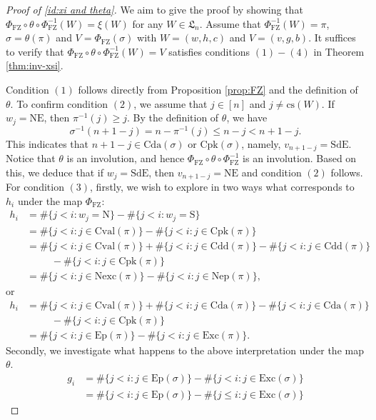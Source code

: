 \documentclass[12pt]{amsart}
\numberwithin{equation}{section}
\theoremstyle{plain}
\theoremstyle{definition}
\def\FZ{\mathrm{FZ}}
\def\LH{\mathfrak{L}}
\def\N{\mathrm{N}}
\def\S{\mathrm{S}}
\def\NE{\mathrm{NE}}
\def\SdE{\mathrm{SdE}}
\def\cs{\mathrm{cs}}
\def\Excp{\mathrm{Ep}}
\def\Exc{\mathrm{Exc}}
\def\Nexc{\mathrm{Nexc}}
\def\Nexcp{\mathrm{Nep}}
\def\Cpk{\mathrm{Cpk}}
\def\Cval{\mathrm{Cval}}
\def\Cda{\mathrm{Cda}}
\def\Cdd{\mathrm{Cdd}}
\begin{document}
\begin{proof}[Proof of \eqref{id:xi and theta}]

We aim to give the proof by showing  that $\Phi_{\FZ} \circ \theta \circ \Phi_{\FZ}^{-1}(W)=\xi(W)$ for any $W\in \LH_n$.
Assume that $\Phi_{\FZ}^{-1}(W)=\pi$, $\sigma=\theta(\pi)$ and $V=\Phi_{\FZ}(\sigma)$ with $W=(w,h,c)$ and $V=(v,g,b)$.
It suffices to verify that $\Phi_{\FZ} \circ \theta \circ \Phi_{\FZ}^{-1}(W)=V$ satisfies conditions $(1) - (4)$ in Theorem \ref{thm:inv-xsi}.

Condition $(1)$ follows directly from Proposition
\ref{prop:FZ} and the definition of $\theta$.  To confirm condition $(2)$,  we assume that $j \in [n]$ and $j \neq \cs(W)$.
If $w_j=\NE$, then $\pi^{-1}(j) \geq j$. By the definition of $\theta$,
we have
\[ \sigma^{-1}(n+1-j) = n-\pi^{-1}(j) \leq n-j <n+1-j.\]
This indicates that $n+1-j \in \Cda(\sigma)$ or $\Cpk(\sigma)$,
namely, $v_{n+1-j}=\SdE$. Notice that $\theta$ is an involution, and hence $\Phi_{\FZ} \circ \theta \circ \Phi_{\FZ}^{-1}$ is an involution.
Based on this, 
we deduce that if $w_j=\SdE$, then $v_{n+1-j}=\NE$ and condition $(2)$
follows.
For condition $(3)$, firstly, we wish to explore in two ways what corresponds to $h_i$ under the map $\Phi_{\FZ}$:
\begin{align*}
  h_i & =\#\{j<i: w_j=\N\}- \#\{j<i: w_j=\S\}\\[3pt]
    & =\#\{j<i: j \in \Cval(\pi)\}- \#\{j<i: j \in \Cpk(\pi)\}\\[3pt]
     & =\#\{j<i: j \in \Cval(\pi)\}+\#\{j<i: j \in \Cdd(\pi)\}-\#\{j<i: j \in \Cdd(\pi)\}\\[3pt]
     &\,\,\,\,\,\,\,\,\,\,\,\,\,\,\,- \#\{j<i: j \in \Cpk(\pi)\}\\
     & =\#\{j<i: j \in \Nexc(\pi)\}-\#\{j<i: j \in \Nexcp(\pi)\},
\end{align*}
or
\begin{align*}
     h_i  & =\#\{j<i: j \in \Cval(\pi)\}+\#\{j<i: j \in \Cda(\pi)\}-\#\{j<i: j \in \Cda(\pi)\}\\[3pt]
     &\,\,\,\,\,\,\,\,\,\,\,\,\,\,\,- \#\{j<i: j \in \Cpk(\pi)\}\\
     & =\#\{j<i: j \in \Excp(\pi)\}-\#\{j<i: j \in \Exc(\pi)\}.
\end{align*}
Secondly, we investigate what happens to the above interpretation under the map $\theta$.
\begin{align*}
     g_i  & =\#\{j<i: j \in \Excp(\sigma)\}-\#\{j<i: j \in \Exc(\sigma)\}\\[3pt]
     & =\#\{j<i: j \in \Excp(\sigma)\}-\#\{j\leq i: j \in \Exc(\sigma)\}

\end{align*}
\end{proof}
\end{document}
